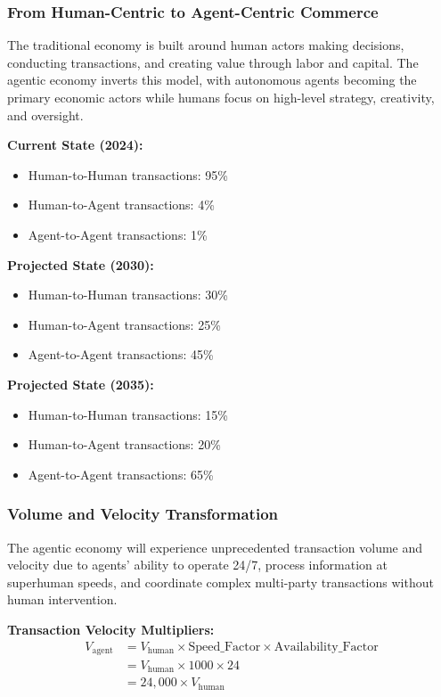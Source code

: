 \documentclass[12pt,a4paper]{article}
\begin{document}
\subsubsection{From Human-Centric to Agent-Centric Commerce}

The traditional economy is built around human actors making decisions, conducting transactions, and creating value through labor and capital. The agentic economy inverts this model, with autonomous agents becoming the primary economic actors while humans focus on high-level strategy, creativity, and oversight.

\textbf{Current State (2024):}
\begin{itemize}
\item Human-to-Human transactions: 95\%
\item Human-to-Agent transactions: 4\%
\item Agent-to-Agent transactions: 1\%
\end{itemize}

\textbf{Projected State (2030):}
\begin{itemize}
\item Human-to-Human transactions: 30\%
\item Human-to-Agent transactions: 25\%
\item Agent-to-Agent transactions: 45\%
\end{itemize}

\textbf{Projected State (2035):}
\begin{itemize}
\item Human-to-Human transactions: 15\%
\item Human-to-Agent transactions: 20\%
\item Agent-to-Agent transactions: 65\%
\end{itemize}

\subsubsection{Volume and Velocity Transformation}

The agentic economy will experience unprecedented transaction volume and velocity due to agents' ability to operate 24/7, process information at superhuman speeds, and coordinate complex multi-party transactions without human intervention.

\textbf{Transaction Velocity Multipliers:}
\begin{align}
V_{\text{agent}} &= V_{\text{human}} \times \text{Speed\_Factor} \times \text{Availability\_Factor} \\
&= V_{\text{human}} \times 1000 \times 24 \\
&= 24,000 \times V_{\text{human}}
\end{align}
\end{document}
